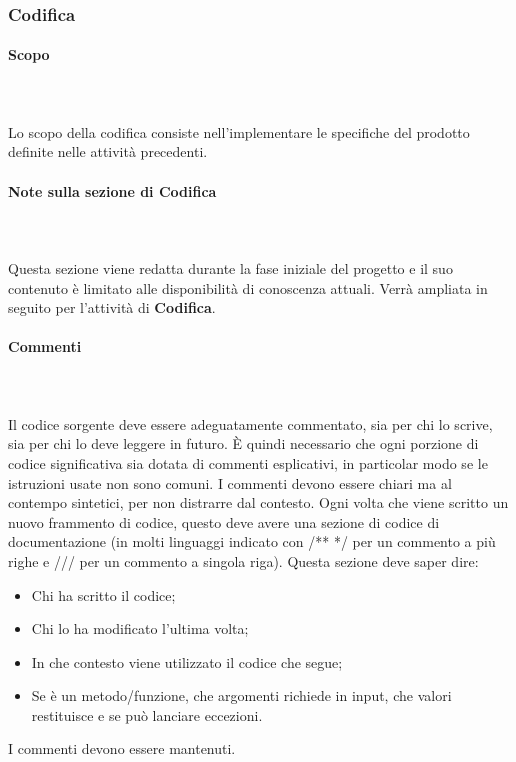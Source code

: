 \subsubsection{Codifica}
\paragraph{Scopo}\mbox{}\\ \\
Lo scopo della codifica consiste nell'implementare le specifiche del prodotto definite nelle attività precedenti.

\paragraph{Note sulla sezione di Codifica}\mbox{}\\ \\
Questa sezione viene redatta durante la fase iniziale del progetto e il suo contenuto è limitato alle disponibilità di conoscenza attuali.
Verrà ampliata in seguito per l'attività di \textbf{Codifica}.

\paragraph{Commenti}\mbox{}\\ \\
Il codice sorgente deve essere adeguatamente commentato, sia per chi lo scrive, sia per chi lo deve leggere in futuro.
È quindi necessario che ogni porzione di codice significativa sia dotata di commenti esplicativi, in particolar modo se le istruzioni usate non sono comuni.
I commenti devono essere chiari ma al contempo sintetici, per non distrarre dal contesto.
Ogni volta che viene scritto un nuovo frammento di codice, questo deve avere una sezione di codice di documentazione (in molti linguaggi indicato con /** */ per un commento a più righe e /// per un commento a singola riga).
Questa sezione deve saper dire:
\begin{itemize}
    \item Chi ha scritto il codice;
    \item Chi lo ha modificato l'ultima volta;
    \item In che contesto viene utilizzato il codice che segue;
    \item Se è un metodo/funzione, che argomenti richiede in input, che valori restituisce e se può lanciare eccezioni.
\end{itemize}
I commenti devono essere mantenuti.

